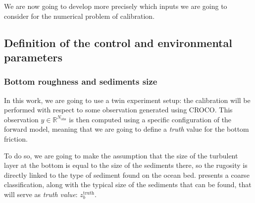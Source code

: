 \documentclass[../../Main_ManuscritThese.tex]{subfiles}
\newcommand{\zob}{z_b}
\begin{document}
We are now going to develop more precisely which inputs we are going
to consider for the numerical problem of calibration.


\subsection{Definition of the control and environmental parameters}
\subsubsection{Bottom roughness and sediments size}
In this work, we are going to use a twin experiment setup: the
calibration will be performed with respect to some observation
generated using CROCO.  This observation
$y\in\mathbb{R}^{N_{\mathrm{obs}}}$ is then computed using a specific
configuration of the forward model, meaning that we are going to
define a \emph{truth} value for the bottom friction.


To do so, we are going to make the assumption that the size of the
turbulent layer at the bottom is equal to the size of the sediments
there, so the rugosity is directly linked to the type of sediment
found on the ocean bed.  presents a coarse
classification, along with the typical size of the sediments that can
be found, that will serve as \emph{truth value}:
$\zob^{\mathrm{truth}}$.  %
\end{document}
